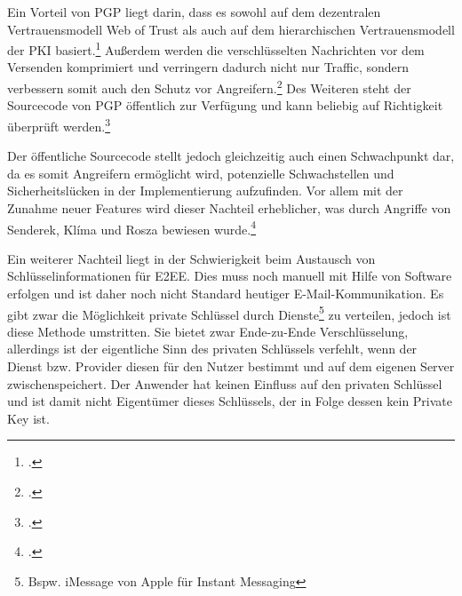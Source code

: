 \documentclass  [paper=a4,
				fontsize=12pt,
				listof=totoc,
				bibliography=totoc
				]{scrreprt}
\begin{document}

				
				
				
				Ein Vorteil von \ac{PGP} liegt darin, dass es sowohl auf dem dezentralen Vertrauensmodell Web of Trust als auch auf dem hierarchischen Vertrauensmodell der \ac{PKI} basiert.\footcite[vgl][S. 38f.]{Schwenk}
				Außerdem werden die verschlüsselten Nachrichten vor dem Versenden komprimiert und verringern dadurch nicht nur Traffic, sondern verbessern somit auch den Schutz vor Angreifern.\footcite[][S. 45]{Schwenk}	
				Des Weiteren steht der Sourcecode von \ac{PGP} öffentlich zur Verfügung und kann beliebig auf Richtigkeit überprüft werden.\footcite[][S. 47]{Schwenk}
				\medskip
									
				
			
			
				Der öffentliche Sourcecode stellt jedoch gleichzeitig auch einen Schwachpunkt dar, da es somit Angreifern ermöglicht wird, potenzielle Schwachstellen und Sicherheitslücken in der Implementierung aufzufinden. Vor allem mit der Zunahme neuer Features wird dieser Nachteil erheblicher, was durch Angriffe von Senderek, Klíma und Rosza bewiesen wurde.\footcite[vgl.][S. 47-55]{Schwenk}
				
				Ein weiterer Nachteil liegt in der Schwierigkeit beim Austausch von Schlüsselinformationen für \ac{E2EE}. Dies muss noch manuell mit Hilfe von Software erfolgen und ist daher noch nicht Standard heutiger E-Mail-Kommunikation. 
				Es gibt zwar die Möglichkeit private Schlüssel durch Dienste\footnote{Bspw. iMessage von Apple für Instant Messaging} zu verteilen, jedoch ist diese Methode umstritten. Sie bietet zwar Ende-zu-Ende Verschlüsselung, allerdings ist der eigentliche Sinn des privaten Schlüssels verfehlt, wenn der Dienst bzw. Provider diesen für den Nutzer bestimmt und auf dem eigenen Server zwischenspeichert. Der Anwender hat keinen Einfluss auf den privaten Schlüssel und ist damit nicht Eigentümer dieses Schlüssels, der in Folge dessen kein Private Key ist. 
\end{document}
